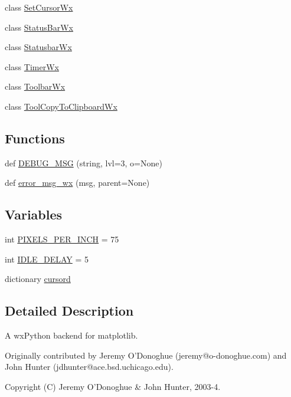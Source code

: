 \begin{DoxyCompactItemize}
class \hyperlink{classmatplotlib_1_1backends_1_1backend__wx_1_1SetCursorWx}{Set\+Cursor\+Wx}
\item 
class \hyperlink{classmatplotlib_1_1backends_1_1backend__wx_1_1StatusBarWx}{Status\+Bar\+Wx}
\item 
class \hyperlink{classmatplotlib_1_1backends_1_1backend__wx_1_1StatusbarWx}{Statusbar\+Wx}
\item 
class \hyperlink{classmatplotlib_1_1backends_1_1backend__wx_1_1TimerWx}{Timer\+Wx}
\item 
class \hyperlink{classmatplotlib_1_1backends_1_1backend__wx_1_1ToolbarWx}{Toolbar\+Wx}
\item 
class \hyperlink{classmatplotlib_1_1backends_1_1backend__wx_1_1ToolCopyToClipboardWx}{Tool\+Copy\+To\+Clipboard\+Wx}
\end{DoxyCompactItemize}
\subsection*{Functions}
\begin{DoxyCompactItemize}
\item 
def \hyperlink{namespacematplotlib_1_1backends_1_1backend__wx_ac1e306b995a1a1d85a2db8cd6b086c2a}{D\+E\+B\+U\+G\+\_\+\+M\+SG} (string, lvl=3, o=None)
\item 
def \hyperlink{namespacematplotlib_1_1backends_1_1backend__wx_a1cb4920788cec39b2ee0bd116decd8ec}{error\+\_\+msg\+\_\+wx} (msg, parent=None)
\end{DoxyCompactItemize}
\subsection*{Variables}
\begin{DoxyCompactItemize}
\item 
int \hyperlink{namespacematplotlib_1_1backends_1_1backend__wx_aa02a9db5b2071a1b39964bf517b2d29a}{P\+I\+X\+E\+L\+S\+\_\+\+P\+E\+R\+\_\+\+I\+N\+CH} = 75
\item 
int \hyperlink{namespacematplotlib_1_1backends_1_1backend__wx_a478249bb1706c6716cc2444407d1a65f}{I\+D\+L\+E\+\_\+\+D\+E\+L\+AY} = 5
\item 
dictionary \hyperlink{namespacematplotlib_1_1backends_1_1backend__wx_a07cf21b199b36577bc8dbb125a90d7ec}{cursord}
\end{DoxyCompactItemize}


\subsection{Detailed Description}
\begin{DoxyVerb}A wxPython backend for matplotlib.

Originally contributed by Jeremy O'Donoghue (jeremy@o-donoghue.com) and John
Hunter (jdhunter@ace.bsd.uchicago.edu).

Copyright (C) Jeremy O'Donoghue & John Hunter, 2003-4.
\end{DoxyVerb}
 

